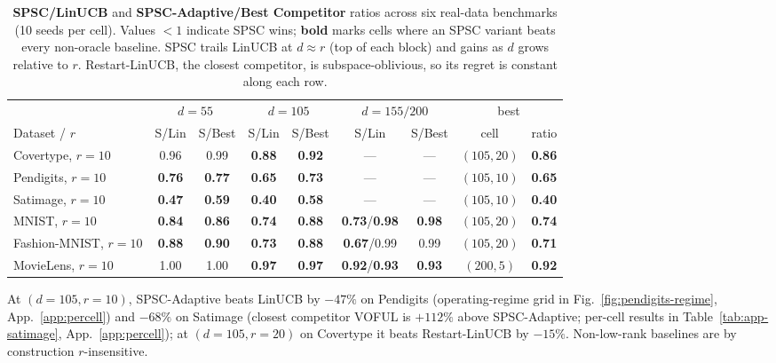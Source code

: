 \documentclass{article}
\begin{document}
\begin{table}[!htbp]
\centering
\caption{\textbf{SPSC/LinUCB} and \textbf{SPSC-Adaptive/Best
  Competitor} ratios across six real-data benchmarks (10 seeds per
  cell). Values ${<}1$ indicate SPSC wins; \textbf{bold} marks cells
  where an SPSC variant beats every non-oracle baseline. SPSC trails
  LinUCB at $d\approx r$ (top of each block) and gains as $d$ grows
  relative to $r$. Restart-LinUCB, the closest competitor, is
  subspace-oblivious, so its regret is constant along each row.}
\label{tab:realdata}
\scriptsize
\setlength{\tabcolsep}{4pt}
\begin{tabular}{lcc@{\hspace{8pt}}cc@{\hspace{8pt}}cc@{\hspace{8pt}}cc}
\toprule
 & \multicolumn{2}{c}{$d{=}55$} & \multicolumn{2}{c}{$d{=}105$} & \multicolumn{2}{c}{$d{=}155/200$} & \multicolumn{2}{c}{best}\\
\cmidrule(lr){2-3}\cmidrule(lr){4-5}\cmidrule(lr){6-7}\cmidrule(lr){8-9}
Dataset / $r$ & S/Lin & S/Best & S/Lin & S/Best & S/Lin & S/Best & cell & ratio\\
\midrule
Covertype,      $r{=}10$ & 0.96           & 0.99           & \textbf{0.88} & \textbf{0.92} &  --- & ---  & $(105,20)$ & \textbf{0.86}\\
Pendigits,      $r{=}10$ & \textbf{0.76}  & \textbf{0.77}  & \textbf{0.65} & \textbf{0.73} &  --- & ---  & $(105,10)$ & \textbf{0.65}\\
Satimage,       $r{=}10$ & \textbf{0.47}  & \textbf{0.59}  & \textbf{0.40} & \textbf{0.58} &  --- & ---  & $(105,10)$ & \textbf{0.40}\\
MNIST,          $r{=}10$ & \textbf{0.84}  & \textbf{0.86}  & \textbf{0.74} & \textbf{0.88} & \textbf{0.73}/\textbf{0.98} & \textbf{0.98} & $(105,20)$ & \textbf{0.74}\\
Fashion-MNIST,  $r{=}10$ & \textbf{0.88}  & \textbf{0.90}  & \textbf{0.73} & \textbf{0.88} & \textbf{0.67}/0.99         & 0.99          & $(105,20)$ & \textbf{0.71}\\
MovieLens,      $r{=}10$ & 1.00           & 1.00           & \textbf{0.97} & \textbf{0.97} & \textbf{0.92}/\textbf{0.93} & \textbf{0.93} & $(200,5)$  & \textbf{0.92}\\
\bottomrule
\end{tabular}
\end{table}

At $(d{=}105, r{=}10)$, SPSC-Adaptive beats LinUCB by $-47\%$ on
Pendigits (operating-regime grid in Fig.~\ref{fig:pendigits-regime},
App.~\ref{app:percell}) and $-68\%$ on Satimage (closest competitor
VOFUL is $+112\%$ above SPSC-Adaptive; per-cell results in
Table~\ref{tab:app-satimage}, App.~\ref{app:percell}); at
$(d{=}105, r{=}20)$ on Covertype it beats Restart-LinUCB by $-15\%$.
Non-low-rank baselines are by construction $r$-insensitive.
\end{document}

